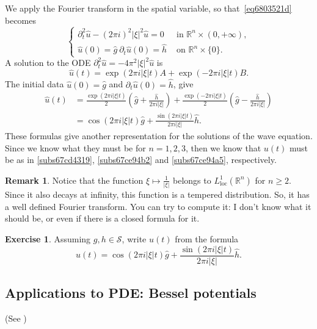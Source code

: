 \documentclass[a4paper,9pt]{amsart}
\newcommand{\scr}[1]{\mathscr{#1}}
\newcommand{\R}{\mathbb{R}}	%
\newcommand{\de}{\partial}		%
\newcommand{\loc}{\mathrm{loc}}
\theoremstyle{plain}
\theoremstyle{definition}
\newtheorem{remark}[proposition]{Remark}
\newtheorem{exercise}[proposition]{Exercise}%
\theoremstyle{remark}
\begin{document}
We apply the Fourier transform in the spatial variable, so that~\eqref{eq6803521d} becomes
\begin{equation}\label{eq68035243}
\begin{cases}
	\de_t^2 \hat u - (2\pi i)^2 |\xi|^2 \hat u = 0 & \text{ in }\R^n\times(0,+\infty) ,\\
	\hat u(0) = \hat g\ \de_t\hat u(0) = \hat h & \text{ on } \R^n\times\{0\} .
\end{cases}
\end{equation}
A solution to the ODE $\de_t^2\hat u = -4\pi^2 |\xi|^2 \hat u$  is
\begin{equation}
	\hat u(t) =  \exp(2\pi i|\xi| t) A + \exp(-2\pi i|\xi| t) B .
\end{equation}
The initial data $\hat u(0)= \hat g$ and $\de_t\hat u(0) = \hat h$, give
\begin{align}
	\hat u(t) 
	&= \frac{ \exp(2\pi i|\xi| t) }{ 2 } \left(\hat g + \frac{\hat h}{2\pi i|\xi|} \right) 
		+ \frac{ \exp(-2\pi i|\xi| t) }{ 2 } \left(\hat g - \frac{\hat h}{2\pi i|\xi|} \right) \\
	&= \cos(2\pi i|\xi| t) \hat g + \frac{\sin(2\pi i|\xi| t)}{2\pi i|\xi|} \hat h .
\end{align}
These formulas give another representation for the solutions of the wave equation.
Since we know what they must be for $n=1,2,3$, then we know that $u(t)$ must be as in 
\ref{subs67cd4319}, \ref{subs67ce94b2} and \ref{subs67ce94a5}, respectively.

\begin{remark}
	Notice that the function $\xi\mapsto\frac1{|\xi|}$ belongs to $L^1_\loc(\R^n)$ for $n\ge2$.
	Since it also decays at infinity, this function is a tempered distribution.
	So, it has a well defined Fourier transform.
	You can try to compute it: I don't know what it should be, or even if there is a closed formula for it.
\end{remark}

\begin{exercise}
	Assuming $g,h\in\scr S$, write $u(t)$ from the formula 
	\begin{equation}
		\hat u(t)
		= \cos(2\pi i|\xi| t) \hat g + \frac{\sin(2\pi i|\xi| t)}{2\pi i|\xi|} \hat h .
	\end{equation}
\end{exercise}

\subsection{Applications to PDE: Bessel potentials}
(See \cite[\S4.3,p.191]{MR2597943})
\end{document}
